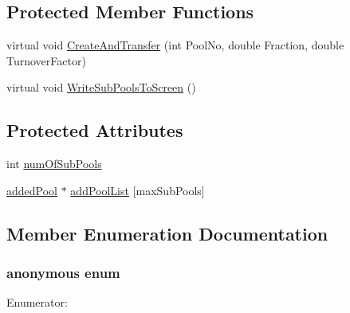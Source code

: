 \subsection*{Protected Member Functions}
\begin{DoxyCompactItemize}
\item 
virtual void \hyperlink{classadded_matter_ae8c4ed6e7730e095e8b644efa46de5ba}{CreateAndTransfer} (int PoolNo, double Fraction, double TurnoverFactor)
\item 
virtual void \hyperlink{classadded_matter_a4c80ef0a6ae9baf0f86537bc77d3a181}{WriteSubPoolsToScreen} ()
\end{DoxyCompactItemize}
\subsection*{Protected Attributes}
\begin{DoxyCompactItemize}
\item 
int \hyperlink{classadded_matter_a65b5923128f9e623e00ec57f8b350397}{numOfSubPools}
\item 
\hyperlink{classadded_pool}{addedPool} $\ast$ \hyperlink{classadded_matter_a984f8ee184aab9aa9591368b053133b3}{addPoolList} \mbox{[}maxSubPools\mbox{]}
\end{DoxyCompactItemize}


\subsection{Member Enumeration Documentation}
\hypertarget{classadded_matter_a619ab88288a9bb86a0595a534b2c05d1}{
\subsubsection[{"@31}]{\setlength{\rightskip}{0pt plus 5cm}anonymous enum}}
\label{classadded_matter_a619ab88288a9bb86a0595a534b2c05d1}
\begin{Desc}
\item[Enumerator: ]\par
\begin{description}
\item[{\em 
\hypertarget{classadded_matter_a619ab88288a9bb86a0595a534b2c05d1a804febe24c08f1e5e886ad2112530242}{
maxSubPools}
\label{classadded_matter_a619ab88288a9bb86a0595a534b2c05d1a804febe24c08f1e5e886ad2112530242}
}]\end{description}
\end{Desc}



